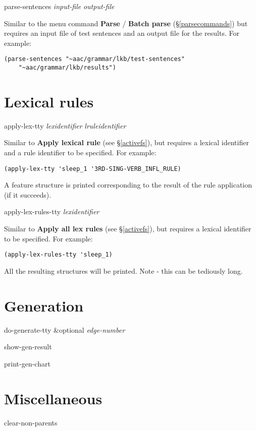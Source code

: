 \documentclass[12pt]{report}
\newcommand{\lispcommand}[1]{\noindent\rm #1}%
\newcommand{\lkbmenucommand}{\bf}
\begin{document}
\lispcommand{parse-sentences {\it input-file} {\it output-file}}

Similar to the menu command {\lkbmenucommand Parse} / {\lkbmenucommand Batch parse}
 (\S\ref{parsecommands}) but requires an input file of test sentences
and an output file for the results.  For example:
\begin{verbatim}
(parse-sentences "~aac/grammar/lkb/test-sentences" 
    "~aac/grammar/lkb/results")
\end{verbatim}

\section{Lexical rules}
\lispcommand{apply-lex-tty {\it lexidentifier} {\it lruleidentifier}}

Similar to {\lkbmenucommand Apply lexical rule} (see \S\ref{activefs}),
but requires a lexical identifier and a rule identifier to be specified.
For example:
\begin{verbatim}
(apply-lex-tty 'sleep_1 '3RD-SING-VERB_INFL_RULE)
\end{verbatim}
A feature structure is printed corresponding to the result 
of the rule application (if it succeeds).

\lispcommand{apply-lex-rules-tty {\it lexidentifier} }

Similar to {\lkbmenucommand Apply all lex rules} (see \S\ref{activefs}),
but requires a lexical identifier to be specified.
For example:
\begin{verbatim}
(apply-lex-rules-tty 'sleep_1)
\end{verbatim}
All the resulting structures will be printed.  Note - this can be
tediously long.

\section{Generation}

\lispcommand{do-generate-tty \&optional {\it edge-number}}

\lispcommand{show-gen-result}

\lispcommand{print-gen-chart}

\section{Miscellaneous}

\lispcommand{clear-non-parents}
\end{document}

